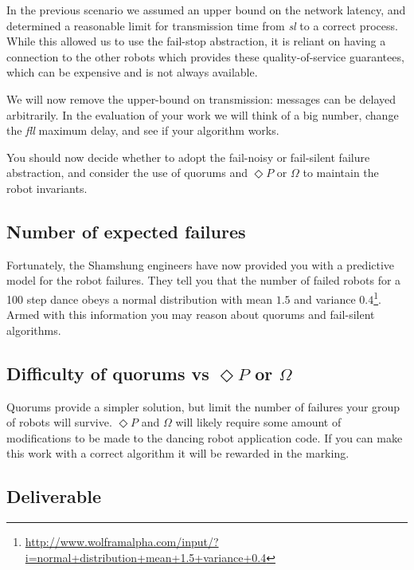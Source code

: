 \documentclass[a4paper]{article}
\begin{document}
In the previous scenario we assumed an upper bound on the network latency, and
determined a reasonable limit for transmission time from \emph{sl} to a
correct process. While this allowed us to use the fail-stop abstraction, it is
reliant on having a connection to the other robots which provides these
quality-of-service guarantees, which can be expensive and is not always
available.

We will now remove the upper-bound on transmission: messages can be delayed
arbitrarily. In the evaluation of your work we will think of a big number,
change the \emph{fll} maximum delay, and see if your algorithm works.

You should now decide whether to adopt the fail-noisy or fail-silent failure
abstraction, and consider the use of quorums and $\Diamond P$ or $\Omega$ to
maintain the robot invariants.

\subsection*{Number of expected failures} %
\label{sub:number_of_expected_failures}

Fortunately, the Shamshung engineers have now provided you with a predictive
model for the robot failures. They tell you that the number of failed robots
for a 100 step dance obeys a normal distribution with mean $1.5$ and variance
$0.4$\footnote{\url{http://www.wolframalpha.com/input/?i=normal+distribution+mean+1.5+variance+0.4}}.
Armed with this information you may reason about quorums and fail-silent
algorithms.



\subsection*{Difficulty of quorums vs $\Diamond P$ or $\Omega$} %
\label{sub:difficulty_of_quorums_vs_diamond_p_}

Quorums provide a simpler solution, but limit the number of failures your
group of robots will survive. $\Diamond P$ and $\Omega$ will likely require
some amount of modifications to be made to the dancing robot application code.
If you can make this work with a correct algorithm it will be rewarded in the
marking.



\subsection*{Deliverable} %
\label{sub:p3_deliverable}
\end{document}
